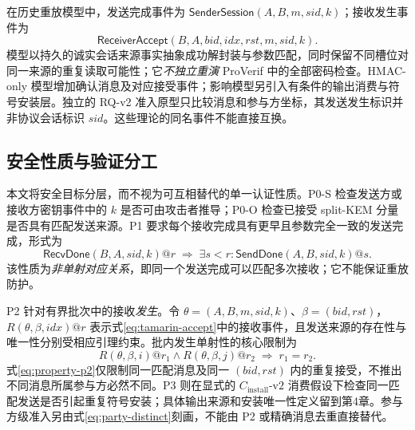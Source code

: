 在历史重放模型中，发送完成事件为 $\mathsf{SenderSession}(A,B,m,sid,k)$；接收发生事件为
\begin{equation}
 \mathsf{ReceiverAccept}(B,A,bid,idx,rst,m,sid,k).
 \label{eq:tamarin-accept}
\end{equation}
模型以持久的诚实会话来源事实抽象成功解封装与参数匹配，同时保留不同槽位对同一来源的重复读取可能性；它\emph{不独立重演} ProVerif 中的全部密码检查。HMAC-only 模型增加确认消息及对应接受事件；影响模型另引入有条件的输出消费与符号安装层。独立的 RQ-v2 准入原型只比较消息和参与方坐标，其发送发生标识并非协议会话标识 $sid$。这些理论的同名事件不能直接互换。

\subsection{安全性质与验证分工}
\label{subsec:formal-properties}

本文将安全目标分层，而不视为可互相替代的单一认证性质。P0-S 检查发送方或接收方密钥事件中的 $k$ 是否可由攻击者推导；P0-O 检查已接受 split-KEM 分量是否具有匹配发送来源。P1 要求每个接收完成具有更早且参数完全一致的发送完成，形式为
\begin{equation}
 \mathsf{RecvDone}(B,A,sid,k)@r\;\Longrightarrow\;
 \exists s<r:\mathsf{SendDone}(A,B,sid,k)@s.
 \label{eq:property-p1}
\end{equation}
该性质为\emph{非单射对应关系}，即同一个发送完成可以匹配多次接收；它不能保证重放防护。

P2 针对有界批次中的接收\emph{发生}。令 $\theta=(A,B,m,sid,k)$、$\beta=(bid,rst)$，$R(\theta,\beta,idx)@r$ 表示式\eqref{eq:tamarin-accept}中的接收事件，且发送来源的存在性与唯一性分别受相应引理约束。批内发生单射性的核心限制为
\begin{equation}
 R(\theta,\beta,i)@r_1\land R(\theta,\beta,j)@r_2
 \;\Longrightarrow\;r_1=r_2.
 \label{eq:property-p2}
\end{equation}
式\eqref{eq:property-p2}仅限制同一匹配消息及同一 $(bid,rst)$ 内的重复接受，不推出不同消息所属参与方必然不同。P3 则在显式的 $C_{\mathrm{install}}\text{-v2}$ 消费假设下检查同一匹配发送是否引起重复符号安装；具体输出来源和安装唯一性定义留到第4章。参与方级准入另由式\eqref{eq:party-distinct}刻画，不能由 P2 或精确消息去重直接替代。

